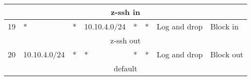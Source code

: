 \documentclass[a4paper, 11pt, oneside]{article}
\begin{document}
\begin{table}[H]
{\begin{tabular}{|llllllll|}
\multicolumn{8}{|c|}{{\color[HTML]{FE0000} z-ssh in}}                                                                                                                                                                                                                                                                                                                                                                                                                                                                    \\ \hline
\multicolumn{1}{|l|}{19}          & \multicolumn{1}{l|}{*}                                                            & \multicolumn{1}{l|}{*}                                                              & \multicolumn{1}{l|}{10.10.4.0/24}                                                      & \multicolumn{1}{l|}{*}                                                                   & \multicolumn{1}{l|}{*}                 & \multicolumn{1}{l|}{Log and drop}    & Block in                               \\ \hline
\multicolumn{8}{|c|}{{\color[HTML]{FE0000} z-ssh out}}                                                                                                                                                                                                                                                                                                                                                                                                                                                                   \\ \hline
\multicolumn{1}{|l|}{20}          & \multicolumn{1}{l|}{10.10.4.0/24}                                                 & \multicolumn{1}{l|}{*}                                                              & \multicolumn{1}{l|}{*}                                                                 & \multicolumn{1}{l|}{*}                                                                   & \multicolumn{1}{l|}{*}                 & \multicolumn{1}{l|}{Log and drop}    & Block out                              \\ \hline
\multicolumn{8}{|c|}{{\color[HTML]{FE0000} default}}                                                                                                                                                                                                                                                                                                                                                                                                                                                                     \\ \hline

\end{tabular}}
\end{table}
\end{document}
